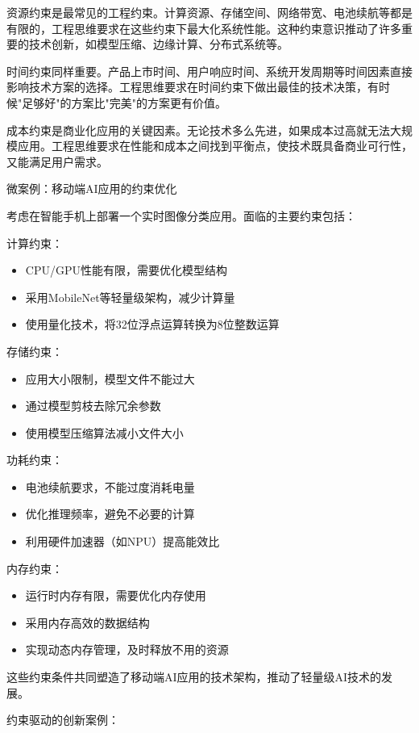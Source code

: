 资源约束是最常见的工程约束。计算资源、存储空间、网络带宽、电池续航等都是有限的，工程思维要求在这些约束下最大化系统性能。这种约束意识推动了许多重要的技术创新，如模型压缩、边缘计算、分布式系统等。

时间约束同样重要。产品上市时间、用户响应时间、系统开发周期等时间因素直接影响技术方案的选择。工程思维要求在时间约束下做出最佳的技术决策，有时候"足够好"的方案比"完美"的方案更有价值。

成本约束是商业化应用的关键因素。无论技术多么先进，如果成本过高就无法大规模应用。工程思维要求在性能和成本之间找到平衡点，使技术既具备商业可行性，又能满足用户需求。

微案例：移动端AI应用的约束优化

考虑在智能手机上部署一个实时图像分类应用。面临的主要约束包括：

计算约束：
\begin{itemize}
\item CPU/GPU性能有限，需要优化模型结构
\item 采用MobileNet等轻量级架构，减少计算量
\item 使用量化技术，将32位浮点运算转换为8位整数运算
\end{itemize}

存储约束：
\begin{itemize}
\item 应用大小限制，模型文件不能过大
\item 通过模型剪枝去除冗余参数
\item 使用模型压缩算法减小文件大小
\end{itemize}

功耗约束：
\begin{itemize}
\item 电池续航要求，不能过度消耗电量
\item 优化推理频率，避免不必要的计算
\item 利用硬件加速器（如NPU）提高能效比
\end{itemize}

内存约束：
\begin{itemize}
\item 运行时内存有限，需要优化内存使用
\item 采用内存高效的数据结构
\item 实现动态内存管理，及时释放不用的资源
\end{itemize}

这些约束条件共同塑造了移动端AI应用的技术架构，推动了轻量级AI技术的发展。

约束驱动的创新案例：

